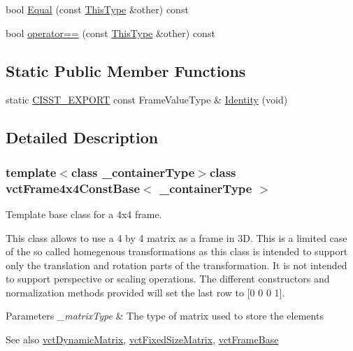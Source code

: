 {\bf }\par
\begin{DoxyCompactItemize}
\item 
bool \hyperlink{classvct_frame4x4_const_base_a385a9f4800f03e5ec2000b05594114ab}{Equal} (const \hyperlink{classvct_frame4x4_const_base_acb37107e49c20bd15139ff196aff1087}{This\+Type} \&other) const 
\item 
bool \hyperlink{classvct_frame4x4_const_base_a366fbd9659cb7829ad43e9f60ae9c80f}{operator==} (const \hyperlink{classvct_frame4x4_const_base_acb37107e49c20bd15139ff196aff1087}{This\+Type} \&other) const 
\end{DoxyCompactItemize}

\subsection*{Static Public Member Functions}
\begin{DoxyCompactItemize}
\item 
static \hyperlink{cmn_export_macros_8h_a99393e0c3ac434b2605235bbe20684f8}{C\+I\+S\+S\+T\+\_\+\+E\+X\+P\+O\+R\+T} const Frame\+Value\+Type \& \hyperlink{classvct_frame4x4_const_base_aef7591558ad3e333ff624bc9e508970a}{Identity} (void)
\end{DoxyCompactItemize}


\subsection{Detailed Description}
\subsubsection*{template$<$class \+\_\+container\+Type$>$class vct\+Frame4x4\+Const\+Base$<$ \+\_\+container\+Type $>$}

Template base class for a 4x4 frame. 

This class allows to use a 4 by 4 matrix as a frame in 3\+D. This is a limited case of the so called homegenous transformations as this class is intended to support only the translation and rotation parts of the transformation. It is not intended to support perspective or scaling operations. The different constructors and normalization methods provided will set the last row to \mbox{[}0 0 0 1\mbox{]}.


\begin{DoxyParams}{Parameters}
{\em \+\_\+matrix\+Type} & The type of matrix used to store the elements\\
\hline
\end{DoxyParams}
\begin{DoxySeeAlso}{See also}
\hyperlink{classvct_dynamic_matrix}{vct\+Dynamic\+Matrix}, \hyperlink{classvct_fixed_size_matrix}{vct\+Fixed\+Size\+Matrix}, \hyperlink{classvct_frame_base}{vct\+Frame\+Base} 
\end{DoxySeeAlso}



